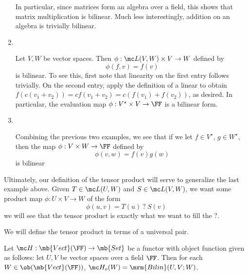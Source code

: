 \documentclass{fkbook}
\theoremstyle{snazzydefinition}
\newenvironment{example}
  {\pushQED{\oldqed}\renewcommand{\qedsymbol}{$\triangle$}\examplex}
  {\popQED\endexamplex}
\begin{document}
\begin{enumerate}[label=\arabic*.]
\begin{leftbar}
\begin{example}
          In particular, since matrices form an algebra over a field, this
          shows that matrix multiplication is bilinear. Much less
          interestingly, addition on an algebra is trivially bilinear.
        \end{example}
      \end{leftbar}
    \item~\vspace{-1.25em}
      \begin{leftbar}\vspace{-1em}
        \begin{example}
          Let $V,W$ be vector spaces. Then $\phi : \mc L(V,W) \times V
          \to W$ defined by
          \[
            \phi(f,v) = f(v)
          \]
          is bilinear. To see this, first note that linearity on the
          first entry follows trivially. On the second entry, apply
          the definition of a linear to obtain $f(c(v_1 + v_2)) =
          cf(v_1 + v_2) = c(f(v_1) + f(v_2))$, as desired. In
          particular, the evaluation map $\phi : V^\star \times V \to
          \FF$ is a bilinear form.
        \end{example}
      \end{leftbar}
    \item~\vspace{-1.25em}
      \begin{leftbar}\vspace{-1em}
        \begin{example}
          Combining the previous two examples, we see that if we let
          $f \in V^\star$, $g \in W^\star$, then the map $\phi : V
          \times W \to \FF$ defined by
          \[
            \phi(v,w) = f(v) g(w)
          \]
          is bilinear
        \end{example}
      \end{leftbar}
  \end{enumerate}
  Ultimately, our definition of the tensor product will serve to
  generalize the last example above. Given $T \in \mc L(U,W)$ and $S
  \in \mc L(V,W)$, we want some product map $\phi : U \times V \to W$
  of the form
  \[
    \phi(u,v) = T(u)\ ?\ S(v)
  \]
  we will see that the tensor product is exactly what we want to fill
  the $?$.



  We will define the tensor product in terms of a universal pair.
  \begin{definition}
    Let $\mc H : \mb{Vect}(\FF) \to \mb{Set}$ be a functor with object
    function given as follows: let $U, V$ be vector spaces over a
    field $\FF$. Then for each $W \in \ob(\mb{Vect}(\FF))$, $\mc
    H_o(W) = \mrm{Bilin}(U, V; W)$.
  \end{definition}
\end{document}

